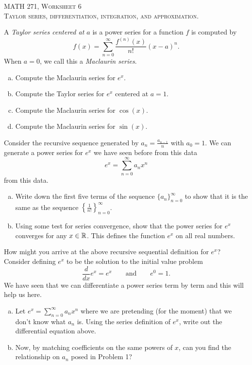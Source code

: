 \documentclass[12pt]{article} %
\begin{document}
\begin{center}
   \textsc{\large MATH 271, Worksheet 6}\\
   \textsc{Taylor series, differentiation, integration, and approximation.}
\end{center}
\vspace{.5cm}

\begin{problem}
A \emph{Taylor series centered at $a$} is a power series for a function $f$ is computed by 
\[
f(x) = \sum_{n=0}^\infty \frac{f^{(n)}(x)}{n!}(x-a)^n.
\]
When $a=0$, we call this a \emph{Maclaurin series}.  
\begin{enumerate}[(a)]
    \item Compute the Maclaurin series for $e^x$.
    \item Compute the Taylor series for $e^x$ centered at $a=1$.
    \item Compute the Maclaurin series for $\cos(x)$.
    \item Compute the Maclaurin series for $\sin(x)$.
\end{enumerate}
\end{problem}

\begin{problem}
Consider the recursive sequence generated by $a_n = \frac{a_{n-1}}{n}$ with $a_0=1$.  We can generate a power series for $e^x$ we have seen before from this data
\[
e^x=\sum_{n=0}^\infty a_n x^n
\]
from this data. 
\begin{enumerate}[(a)]
    \item Write down the first five terms of the sequence $\{a_n\}_{n=0}^\infty$ to show that it is the same as the sequence $\left\{\frac{1}{n!}\right\}_{n=0}^\infty$.
    \item Using some test for series convergence, show that the power series for $e^x$ converges for any $x\in \mathbb{R}$. This defines the function $e^x$ on all real numbers.
\end{enumerate}
\end{problem}

\begin{problem}
How might you arrive at the above recursive sequential definition for $e^x$? Consider defining $e^x$ to be the solution to the initial value problem
\[
\frac{d}{dx} e^x = e^x \qquad \textrm{and} \qquad e^0=1.
\]
We have seen that we can differentiate a power series term by term and this will help us here.
\begin{enumerate}[(a)]
    \item Let $e^x = \sum_{n=0}^\infty a_n x^n$ where we are pretending (for the moment) that we don't know what $a_n$ is.  Using the series definition of $e^x$, write out the differential equation above.
    \item Now, by matching coefficients on the same powers of $x$, can you find the relationship on $a_n$ posed in Problem 1?
\end{enumerate}
\end{problem}
\end{document}
